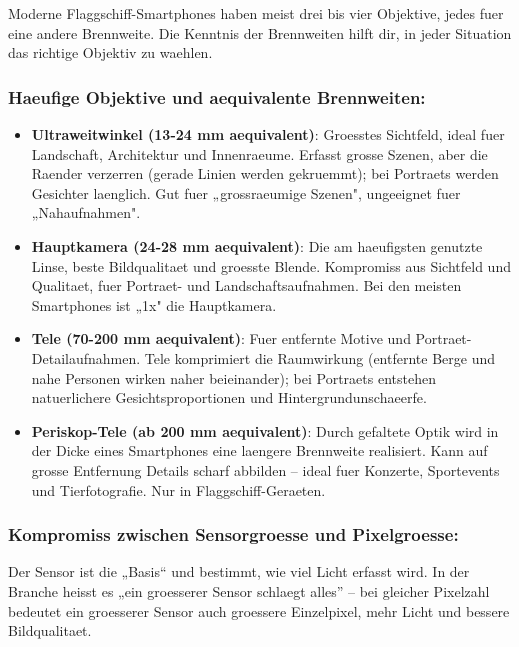 
Moderne Flaggschiff-Smartphones haben meist drei bis vier Objektive, jedes fuer eine andere Brennweite. Die Kenntnis der Brennweiten hilft dir, in jeder Situation das richtige Objektiv zu waehlen.

\subsubsection*{Haeufige Objektive und aequivalente Brennweiten:}

\begin{itemize}
  \item \textbf{Ultraweitwinkel (13-24 mm aequivalent)}: Groesstes Sichtfeld, ideal fuer Landschaft, Architektur und Innenraeume. Erfasst grosse Szenen, aber die Raender verzerren (gerade Linien werden gekruemmt); bei Portraets werden Gesichter laenglich. Gut fuer „grossraeumige Szenen", ungeeignet fuer „Nahaufnahmen".
  \item \textbf{Hauptkamera (24-28 mm aequivalent)}: Die am haeufigsten genutzte Linse, beste Bildqualitaet und groesste Blende. Kompromiss aus Sichtfeld und Qualitaet, fuer Portraet- und Landschaftsaufnahmen. Bei den meisten Smartphones ist „1x" die Hauptkamera.
  \item \textbf{Tele (70-200 mm aequivalent)}: Fuer entfernte Motive und Portraet-Detailaufnahmen. Tele komprimiert die Raumwirkung (entfernte Berge und nahe Personen wirken naher beieinander); bei Portraets entstehen natuerlichere Gesichtsproportionen und Hintergrundunschaeerfe.
  \item \textbf{Periskop-Tele (ab 200 mm aequivalent)}: Durch gefaltete Optik wird in der Dicke eines Smartphones eine laengere Brennweite realisiert. Kann auf grosse Entfernung Details scharf abbilden – ideal fuer Konzerte, Sportevents und Tierfotografie. Nur in Flaggschiff-Geraeten.
\end{itemize}

\subsubsection*{Kompromiss zwischen Sensorgroesse und Pixelgroesse:}

Der Sensor ist die „Basis“ und bestimmt, wie viel Licht erfasst wird. In der Branche heisst es „ein groesserer Sensor schlaegt alles” – bei gleicher Pixelzahl bedeutet ein groesserer Sensor auch groessere Einzelpixel, mehr Licht und bessere Bildqualitaet.

